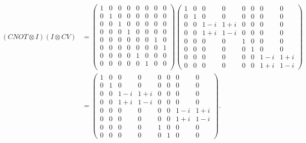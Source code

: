 \documentclass[10pt]{article}
\begin{document}
\begin{align*}
(CNOT \otimes I)(I \otimes CV)
&= 
\begin{pmatrix}
1 & 0 & 0 & 0 & 0 & 0 & 0 & 0 \\
0 & 1 & 0 & 0 & 0 & 0 & 0 & 0 \\
0 & 0 & 1 & 0 & 0 & 0 & 0 & 0 \\
0 & 0 & 0 & 1 & 0 & 0 & 0 & 0 \\
\hline 
0 & 0 & 0 & 0 & 0 & 0 & 1 & 0 \\
0 & 0 & 0 & 0 & 0 & 0 & 0 & 1\\
0 & 0 & 0 & 0 & 1 & 0 & 0 & 0 \\
0 & 0 & 0 & 0 & 0 & 1 & 0 & 0 \\ 
\end{pmatrix} 
\begin{pmatrix}
1 & 0 & 0 & 0 & 0 & 0 & 0 & 0 \\
0 & 1 & 0 & 0 & 0 & 0 & 0 & 0 \\
0 & 0 & 1 - i & 1 + i & 0 & 0 & 0 & 0 \\
0 & 0 & 1 + i & 1 - i & 0 & 0 & 0 & 0 \\
\hline
0 & 0 & 0 & 0 & 1 & 0 & 0 & 0 \\
0 & 0 & 0 & 0 & 0 & 1 & 0 & 0 \\
0 & 0 & 0 & 0 & 0 & 0 & 1-i & 1+i \\
0 & 0 & 0 & 0 & 0 & 0 & 1+i & 1-i
\end{pmatrix} \\
&= 
\begin{pmatrix}
1 & 0 & 0      & 0    & 0 & 0 & 0   & 0 \\
0 & 1 & 0      & 0    & 0 & 0 & 0   & 0 \\
0 & 0 & 1 - i & 1+i & 0 & 0 & 0   & 0 \\
0 & 0 & 1 +i & 1-i  & 0 & 0 & 0   & 0 \\
0 & 0 & 0     & 0     & 0 & 0 & 1-i & 1+ i \\
0 & 0 & 0     & 0     & 0 & 0 & 1+i & 1-i \\
0 & 0 & 0     & 0     & 1 & 0 & 0    & 0 \\
0 & 0 & 0     & 0     & 0 & 1 & 0    & 0 
\end{pmatrix}.
\end{align*}
\end{document}
